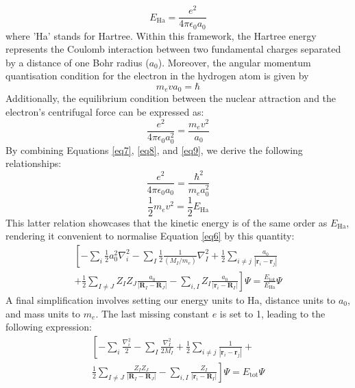 \begin{equation}
  \label{eq7}
  E_{\text{Ha}} = \frac{e^2}{4 \pi \epsilon_0 a_0}
\end{equation}
where 'Ha' stands for Hartree. Within this framework, the Hartree energy represents the Coulomb interaction between two fundamental charges separated by a distance of one Bohr radius ($a_0$). Moreover, the angular momentum quantisation condition for the electron in the hydrogen atom is given by
\begin{equation}
  \label{eq8}
  m_e v a_0 = \hbar
\end{equation}
Additionally, the equilibrium condition between the nuclear attraction and the electron's centrifugal force can be expressed as:
\begin{equation}
  \label{eq9}
  \frac{e^2}{4 \pi \epsilon_0 a_0^2} = \frac{m_e v^2}{a_0}
\end{equation}
By combining Equations \ref{eq7}, \ref{eq8}, and \ref{eq9}, we derive the 
following relationships:
\begin{equation}
  \label{eq10}
  \frac{e^2}{4 \pi \epsilon_0 a_0} = \frac{\hbar^2}{m_e a_0^2}
\end{equation}
\begin{equation}
  \label{eq11}
  \frac{1}{2} m_e v^2 = \frac{1}{2}E_{\text{Ha}}
\end{equation}
This latter relation showcases that the kinetic energy is of the same order as $E_\text{Ha}$, rendering it convenient to normalise Equation \ref{eq6} by this quantity:
\begin{equation}
  \label{eq12}
  \begin{split}
    \left[
      -\sum_i \frac{1}{2}a_0^2 \nabla_i^2 
      - \sum_I \frac{1}{2} \frac{1}{(M_I/m_e)} \nabla_I^2 
      + \frac{1}{2} \sum_{i\neq j} \frac{a_0}{|\mathbf{r}_i - \mathbf{r}_j|}\right. \\
      \left. +  \frac{1}{2} \sum_{I\neq J} Z_I Z_J \frac{a_0}{|\mathbf{R}_I - \mathbf{R}_J|} 
      - \sum_{i, I} Z_I \frac{a_0}{|\mathbf{r}_i - \mathbf{R}_I|}
    \right]\Psi = \frac{E_{\text{tot}}}{E_{\text{Ha}}} \Psi
  \end{split}
\end{equation}
A final simplification involves setting our energy units to Ha, distance units to $a_0$, and mass units to $m_e$. The last missing constant $e$ is set to 1, leading to the following expression: 
\begin{equation}
  \label{eq13}
  \begin{split}
    \left[
      -\sum_i \frac{\nabla_i^2}{2}
      - \sum_I \frac{\nabla_I^2}{2 M_I} 
      + \frac{1}{2} \sum_{i\neq j} \frac{1}{|\mathbf{r}_i - \mathbf{r}_j|} + \right. \\
      \left. \frac{1}{2} \sum_{I\neq J} \frac{Z_I Z_J} {|\mathbf{R}_I - \mathbf{R}_J|} 
      - \sum_{i, I} \frac{Z_I}{|\mathbf{r}_i - \mathbf{R}_I|}
    \right]\Psi = E_{\text{tot}} \Psi
  \end{split}
\end{equation}

